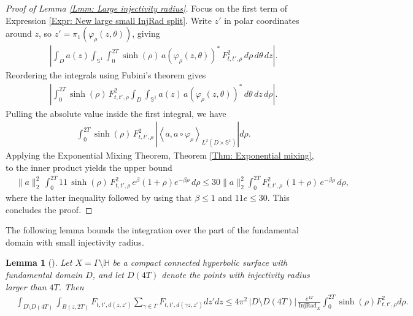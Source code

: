 \documentclass[11pt,twoside,reqno]{amsart} \usepackage{a4wide} \usepackage[T1]{fontenc} \usepackage[utf8]{inputenc} \usepackage{soul}  \usepackage{amsmath} \usepackage{amsfonts} \usepackage{amssymb} \usepackage{mathtools} \usepackage{amsthm} \usepackage{xcolor} \usepackage{graphicx} \usepackage{hyperref} \usepackage{standalone} \usepackage{esint} \usepackage{comment} \usepackage[left=2.3cm,top=3cm,right=2.3cm]{geometry} \usepackage{bm} \usepackage{svg} \usepackage{float} \numberwithin{equation}{section} \theoremstyle{plain} \newtheorem{thm}{Theorem}[section] \newtheorem{theorem}[thm]{Theorem} \newtheorem*{theorem*}{Theorem}\newtheorem{conj}[thm]{Conjecture} \newtheorem{lemma}[thm]{Lemma} \newtheorem{prop}[thm]{Proposition} \newtheorem{proposition}[thm]{Proposition} \newtheorem{cor}[thm]{Corollary} \newtheorem{question}[thm]{Question} \newtheorem{corollary}[thm]{Corollary} \newtheorem{assumption}[thm]{Assumption} \theoremstyle{definition} \newtheorem{defn}[thm]{Definition} \newtheorem{choice}[thm]{Choice} \newtheorem{definition}[thm]{Definition} \newtheorem{ex}[thm]{Example} \newtheorem{notation}[thm]{Notation} \newtheorem*{ack}{Acknowledgements} \theoremstyle{remark} \newtheorem{remark}[thm]{Remark} \newtheorem{bigremark}[thm]{Remark} \usepackage{xcolor} \newcommand{\red}[1]{ {\color{Red}#1} } \newcommand{\blue}[1]{ {\color{Blue}#1} } \author{Kai Hippi} \address{Aalto University, Espoo, Finland} \email{kai.hippi@aalto.fi}
\begin{document}
\begin{proof}[Proof of Lemma \ref{Lmm: Large injectivity radius}]
Focus on the first term of Expression \eqref{Expr: New large small InjRad split}. Write $ z' $ in polar coordinates around $ z $, so $ z' = \pi_{1}(\varphi_{\rho}( z,\theta )) $, giving
	\begin{align*}
		&
		\left| \int_{D} a( z ) \int_{\mathbb{S}^{1}} \int_{0}^{2T} \sinh( \rho ) \,  a( \varphi_{\rho}( z,\theta ) )^{*}  \,  F_{t,t', \rho }^{2}  \, d\rho \, d\theta \, dz\right|.
	\end{align*}
	Reordering the integrals using Fubini's theorem gives
	\begin{align*}
		&
		\left| \int_{0}^{2T} \sinh( \rho ) \, F_{t,t',\rho}^{2}  \int_{D} \int_{\mathbb{S}^{1}}  a( z ) \, a( \varphi_{\rho}( z, \theta ) )^{*} \, d\theta \, dz \, d \rho \right|.
	\end{align*}
	Pulling the absolute value inside the first integral, we have
	\begin{align*}
		&
		\int_{0}^{2T} \sinh( \rho )  \, F_{t,t',\rho}^{2} \, \left| \left \langle a, a \circ \varphi_{\rho} \right \rangle_{ L^{2}( D \times \mathbb{S}^{1} ) }  \right|  d \rho.
	\end{align*}
	Applying the Exponential Mixing Theorem, Theorem \ref{Thm: Exponential mixing}, to the inner product yields the upper bound
	\begin{align*}
		&
		\|a \|_{2}^{2} \,\int_{0}^{2T} 11 \, \sinh( \rho ) \, F_{t,t',\rho}^{2} \, e^{ \beta } ( 1 + \rho ) e^{ - \beta \rho } \, d \rho \leq 30 \| a \|_{2}^{2} \int_{0}^{2T} F_{t,t',\rho}^{2} \, ( 1 + \rho ) \, e^{ -\beta \rho } \, d\rho,
	\end{align*}
	where the latter inequality followed by using that $ \beta \leq 1 $ and $11 e \leq 30$. This concludes the proof.

\end{proof}

The following lemma bounds the integration over the part of the fundamental domain with small injectivity radius.

\begin{lemma}[]
	\label{Lmm: Small injectivity radius}
	Let $ X = \Gamma \setminus \mathbb{H} $ be a compact connected hyperbolic surface with fundamental domain $ D $, and let $ D( 4T ) $ denote the points with injectivity radius larger than $ 4T $. Then
	\begin{align*}
		&
		\int_{D \setminus D( 4T )} \int_{ B( z, 2T ) }   F_{t,t', d( z,z' )}  \sum_{\gamma \in \Gamma}^{} F_{t,t', d( \gamma z, z' )} dz' dz 
		\leq 4 \pi^{2} \, | D \setminus D( 4T ) | \, \frac{e^{4T}}{\operatorname{InjRad}_{X}} \int_{0}^{2T} \sinh( \rho ) F_{t,t',\rho}^{2} d\rho.
	\end{align*}
\end{lemma}
\end{document}
